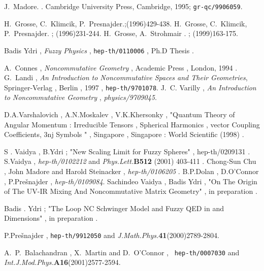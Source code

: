 \documentclass[a4paper,10pt]{article}
\begin{document}
\begin{thebibliography}{99}

J.~Madore.
.
\newblock Cambridge University Press, Cambridge, 1995;
{\tt gr-qc/9906059}.

H.~Grosse, C.~Klimcik, P.~Presnajder.;(1996)429-438. H.~Grosse, C.~Klimcik, P.~Presnajder.
; (1996)231-244.
H.~Grosse, A.~Strohmair .
; (1999)163-175.

Badis Ydri , {\it Fuzzy Physics} , {\tt hep-th/0110006} , Ph.D
Thesis .

A.~Connes , {\em Noncommutative Geometry} , Academic Press ,
London, 1994 . G.~Landi , {\em An Introduction to Noncommutative
Spaces and Their Geometries}, Springer-Verlag , Berlin , 1997 ,
{\tt hep-th/9701078}. J.~C. Varilly , {\it An Introduction to
Noncommutative Geometry} , {\em physics/9709045}.

D.A.Varshalovich , A.N.Moskalev , V.K.Khersonky , "Quantum Theory
of Angular Momentum : Irreducible Tensors , Spherical Harmonics ,
vector Coupling Coefficients, 3nj Symbols " , Singapore ,
Singapore : World Scientific (1998) .

S . Vaidya , B.Ydri ; "New Scaling Limit for Fuzzy Spheres" ,
hep-th/0209131 . S.Vaidya , {\it hep-th/0102212} and {\em
Phys.Lett.}{\bf B512} (2001) 403-411 . Chong-Sun Chu , John
Madore and Harold Steinacker , {\it hep-th/0106205} . B.P.Dolan ,
D.O'Connor , P.Pre\v{s}najder , {\it hep-th/0109084}. Sachindeo
Vaidya , Badis Ydri , "On The Origin of The UV-IR Mixing And
Noncommutative Matrix Geometry" , in preparation .

Badis . Ydri ; "The \coordHE{}Loop NC Schwinger Model and Fuzzy QED in \coordHE{} and \coordHE{}Dimensions" , in preparation .

P.Pre\v{s}najder , {\tt hep-th/9912050} and {\em
J.Math.Phys.}{\bf 41}(2000)2789-2804.




A.~P.~Balachandran , X.~Martin and D.~O'Connor , {\tt
hep-th/0007030} and {\em Int.J.Mod.Phys.}{\bf A16}(2001)2577-2594.


\end{thebibliography}
\end{document}
